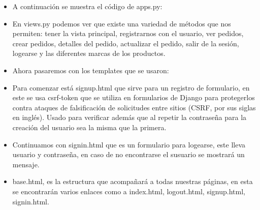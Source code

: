 \documentclass{article}
\begin{document}
\begin{itemize}
\begin{itemize}
\begin{itemize}
                    \item A continuación se muestra el código de apps.py:

            \end{itemize}
            

            \begin{itemize}

                    \item En views.py podemos ver que existe una variedad de métodos que nos permiten: tener la vista principal, registrarnos con el usuario, ver pedidos, crear pedidos, detalles del pedido, actualizar el pedido, salir de la sesión, logearse y las diferentes marcas de los productos.

            \end{itemize}
            

            \begin{itemize}
                    \item Ahora pasaremos con los templates que se usaron:
                    \item Para comenzar está signup.html que sirve para un registro de formulario, en este se usa  csrf-token que se utiliza en formularios de Django para protegerlos contra ataques de falsificación de solicitudes entre sitios (CSRF, por sus siglas en inglés). Usado para verificar además que al repetir la contraseña para la creación del usuario sea la misma que la primera.
            \end{itemize}
            
            \begin{itemize}
                    \item Continuamos con signin.html que es un formulario para logearse, este lleva usuario y contraseña, en caso de no encontrarse el susuario se mostrará un mensaje.
            \end{itemize}
            
            \begin{itemize}
                    \item base.html, es la estructura que acompañará a todas nuestras páginas, en esta se encontrarán varios enlaces como a index.html, logout.html, signup.html, signin.html.
            \end{itemize}
            
            

\end{itemize}
\end{itemize}
\end{document}
